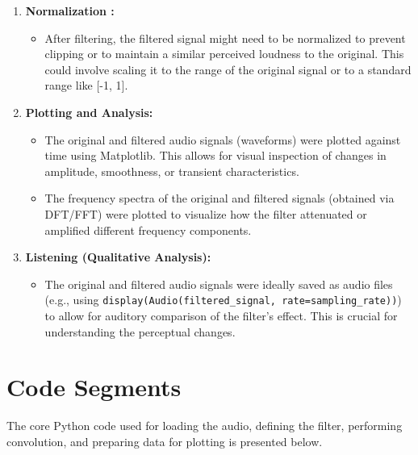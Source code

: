 \documentclass[12pt, a4paper]{article}
\begin{document}
\begin{enumerate}
    \item \textbf{Normalization :}
        \begin{itemize}
            \item After filtering, the filtered signal might need to be normalized to prevent clipping or to maintain a similar perceived loudness to the original. This could involve scaling it to the range of the original signal or to a standard range like [-1, 1].
        \end{itemize}

    \item \textbf{Plotting and Analysis:}
        \begin{itemize}
            \item The original and filtered audio signals (waveforms) were plotted against time using Matplotlib. This allows for visual inspection of changes in amplitude, smoothness, or transient characteristics.
            \item The frequency spectra of the original and filtered signals (obtained via DFT/FFT) were plotted to visualize how the filter attenuated or amplified different frequency components.
        \end{itemize}

\item \textbf{Listening (Qualitative Analysis):}
        \begin{itemize}
            \item The original and filtered audio signals were ideally saved as audio files (e.g., using \texttt{display(Audio(filtered\_signal, rate=sampling\_rate))}) to allow for auditory comparison of the filter's effect. This is crucial for understanding the perceptual changes.
        \end{itemize}
\end{enumerate}

\section{Code Segments}
\label{sec:code_segments}
The core Python code used for loading the audio, defining the filter, performing convolution, and preparing data for plotting is presented below.
\end{document}
